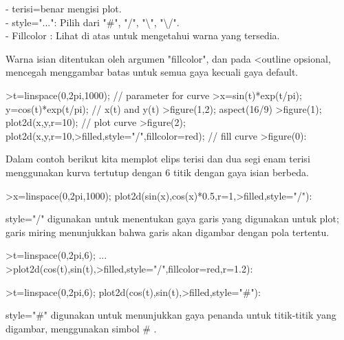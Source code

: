 \documentclass{article}
\begin{document}
\begin{eulernotebook}
\begin{eulercomment}
\begin{eulercomment}
\begin{eulercomment}
\begin{eulercomment}
\begin{eulercomment}
\begin{eulercomment}
\begin{eulercomment}
\begin{eulercomment}
\begin{eulercomment}
\begin{eulercomment}
\begin{eulercomment}
\begin{eulercomment}
\begin{eulercomment}
- terisi=benar mengisi plot.\\
- style="...": Pilih dari "#", "/", "\textbackslash{}", "\textbackslash{}/".\\
- Fillcolor : Lihat di atas untuk mengetahui warna yang tersedia.

Warna isian ditentukan oleh argumen "fillcolor", dan pada \textless{}outline
opsional, mencegah menggambar batas untuk semua gaya kecuali gaya
default.
\end{eulercomment}
\begin{eulerprompt}
>t=linspace(0,2pi,1000); // parameter for curve
>x=sin(t)*exp(t/pi); y=cos(t)*exp(t/pi); // x(t) and y(t)
>figure(1,2); aspect(16/9)
>figure(1); plot2d(x,y,r=10); // plot curve
>figure(2); plot2d(x,y,r=10,>filled,style="/",fillcolor=red); // fill curve
>figure(0):
\end{eulerprompt}
\begin{eulercomment}
Dalam contoh berikut kita memplot elips terisi dan dua segi enam
terisi menggunakan kurva tertutup dengan 6 titik dengan gaya isian
berbeda.
\end{eulercomment}
\begin{eulerprompt}
>x=linspace(0,2pi,1000); plot2d(sin(x),cos(x)*0.5,r=1,>filled,style="/"):
\end{eulerprompt}
\begin{eulercomment}
style="/" digunakan untuk menentukan gaya garis yang digunakan untuk
plot; garis miring menunjukkan bahwa garis akan digambar dengan pola
tertentu.
\end{eulercomment}
\begin{eulerprompt}
>t=linspace(0,2pi,6); ...
>plot2d(cos(t),sin(t),>filled,style="/",fillcolor=red,r=1.2):
\end{eulerprompt}
\begin{eulerprompt}
>t=linspace(0,2pi,6); plot2d(cos(t),sin(t),>filled,style="#"):
\end{eulerprompt}
\begin{eulercomment}
style="#" digunakan untuk menunjukkan gaya penanda untuk titik-titik
yang digambar, menggunakan simbol # .


\end{eulercomment}
\end{eulercomment}
\end{eulercomment}
\end{eulercomment}
\end{eulercomment}
\end{eulercomment}
\end{eulercomment}
\end{eulercomment}
\end{eulercomment}
\end{eulercomment}
\end{eulercomment}
\end{eulercomment}
\end{eulercomment}
\end{eulernotebook}
\end{document}
